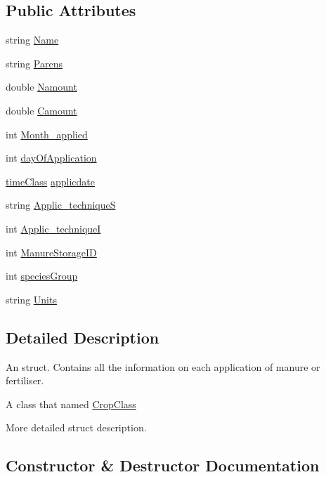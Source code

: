 \subsection*{Public Attributes}
\begin{DoxyCompactItemize}
\item 
string \mbox{\hyperlink{classfert_record_a04116c39447ca7dba821361c530b23f9}{Name}}
\item 
string \mbox{\hyperlink{classfert_record_a4581cecf1c4f53b6809c7878c5ea75ff}{Parens}}
\item 
double \mbox{\hyperlink{classfert_record_a60a97d66e846afeb5e5b6425d89b2427}{Namount}}
\item 
double \mbox{\hyperlink{classfert_record_a7f27f6a12e169928db44a8bb073dca7d}{Camount}}
\item 
int \mbox{\hyperlink{classfert_record_aa387b8011b0ad697b1d8ab0ee821a425}{Month\+\_\+applied}}
\item 
int \mbox{\hyperlink{classfert_record_a999d28e9fac11717726d469ffefe0292}{day\+Of\+Application}}
\item 
\mbox{\hyperlink{classtime_class}{time\+Class}} \mbox{\hyperlink{classfert_record_abb3dcc8fe64aef946d15be6992bc0622}{applicdate}}
\item 
string \mbox{\hyperlink{classfert_record_af8971d0933ac0e105cff348940b15e72}{Applic\+\_\+techniqueS}}
\item 
int \mbox{\hyperlink{classfert_record_acd5d93cefcdeac346e4f2da0d794b02e}{Applic\+\_\+techniqueI}}
\item 
int \mbox{\hyperlink{classfert_record_a91e455f4ce8924187f4351359f1c0be7}{Manure\+Storage\+ID}}
\item 
int \mbox{\hyperlink{classfert_record_a771d65e534ff875346acaadb64052ae6}{species\+Group}}
\item 
string \mbox{\hyperlink{classfert_record_a9a4acd1daa3940bca690a0dd8a939cdb}{Units}}
\end{DoxyCompactItemize}


\subsection{Detailed Description}
An struct. Contains all the information on each application of manure or fertiliser. 

A class that named \mbox{\hyperlink{class_crop_class}{Crop\+Class}}

More detailed struct description. 

\subsection{Constructor \& Destructor Documentation}
\mbox{\label{classfert_record_a9214625e78769dae7f0350c12856e0b4}} 
